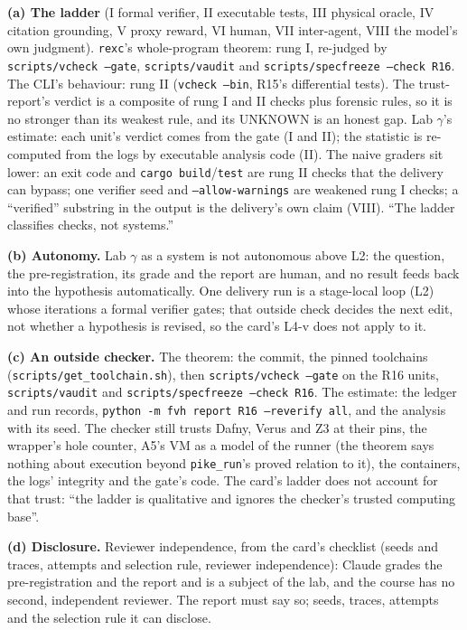 \documentclass[11pt]{article}
\begin{document}
\begin{answer}
\textbf{(a) The ladder} (I formal verifier, II executable tests, III physical
oracle, IV citation grounding, V proxy reward, VI human, VII inter-agent, VIII
the model's own judgment). \texttt{rexc}'s whole-program theorem: rung I,
re-judged by \texttt{scripts/vcheck --gate}, \texttt{scripts/vaudit} and
\texttt{scripts/specfreeze --check R16}. The CLI's behaviour: rung II
(\texttt{vcheck --bin}, R15's differential tests). The trust-report's verdict
is a composite of rung I and II checks plus forensic rules, so it is no
stronger than its weakest rule, and its UNKNOWN is an honest gap. Lab
$\gamma$'s estimate: each unit's verdict comes from the gate (I and II); the
statistic is re-computed from the logs by executable analysis code (II). The
naive graders sit lower: an exit code and \texttt{cargo build}/\texttt{test}
are rung II checks that the delivery can bypass; one verifier seed and
\texttt{--allow-warnings} are weakened rung I checks; a ``verified'' substring
in the output is the delivery's own claim (VIII). ``The ladder classifies
checks, not systems.''

\textbf{(b) Autonomy.} Lab $\gamma$ as a system is not autonomous above L2: the
question, the pre-registration, its grade and the report are human, and no
result feeds back into the hypothesis automatically. One delivery run is a
stage-local loop (L2) whose iterations a formal verifier gates; that outside
check decides the next edit, not whether a hypothesis is revised, so the card's
L4-v does not apply to it.

\textbf{(c) An outside checker.} The theorem: the commit, the pinned toolchains
(\texttt{scripts/get\_toolchain.sh}), then \texttt{scripts/vcheck --gate} on
the R16 units, \texttt{scripts/vaudit} and \texttt{scripts/specfreeze --check
R16}. The estimate: the ledger and run records, \texttt{python -m fvh report
R16 --reverify all}, and the analysis with its seed. The checker still trusts
Dafny, Verus and Z3 at their pins, the wrapper's hole counter, A5's VM as a
model of the runner (the theorem says nothing about execution beyond
\texttt{pike\_run}'s proved relation to it), the containers, the logs'
integrity and the gate's code. The card's ladder does not account for that
trust: ``the ladder is qualitative and ignores the checker's trusted computing
base''.

\textbf{(d) Disclosure.} Reviewer independence, from the card's checklist
(seeds and traces, attempts and selection rule, reviewer independence): Claude
grades the pre-registration and the report and is a subject of the lab, and the
course has no second, independent reviewer. The report must say so; seeds,
traces, attempts and the selection rule it can disclose.
\end{answer}
\end{document}
